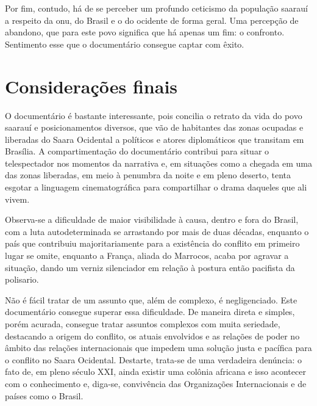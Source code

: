 	Por fim, contudo, há de se perceber um profundo ceticismo da população saarauí a respeito da \gls{onu}, do Brasil e o do ocidente de forma geral. Uma percepção de abandono, que para este povo significa que há apenas um fim: o confronto. Sentimento esse que o documentário consegue captar com êxito.
	
	\section{Considerações finais} \label{sec:final}
	
	O documentário é bastante interessante, pois concilia o retrato da vida do povo saarauí e posicionamentos diversos, que vão de habitantes das zonas ocupadas e liberadas do Saara Ocidental a políticos e atores diplomáticos que transitam em Brasília. A compartimentação do documentário contribui para situar o telespectador nos momentos da narrativa e, em situações como a chegada em uma das zonas liberadas, em meio à penumbra da noite e em pleno deserto, tenta esgotar a linguagem cinematográfica para compartilhar o drama daqueles que ali vivem.
		
	Observa-se a dificuldade de maior visibilidade à causa, dentro e fora do Brasil, com a luta autodeterminada se arrastando por mais de duas décadas, enquanto o país que contribuiu majoritariamente para a existência do conflito em primeiro lugar se omite, enquanto a França, aliada do Marrocos, acaba por agravar a situação, dando um verniz silenciador em relação à postura então pacifista da \gls{polisario}.
		
	Não é fácil tratar de um assunto que, além de complexo, é negligenciado. Este documentário consegue superar essa dificuldade. De maneira direta e simples, porém acurada, consegue tratar assuntos complexos com muita seriedade, destacando a origem do conflito, os atuais envolvidos e as relações de poder no âmbito das relações internacionais que impedem uma solução justa e pacífica para o conflito no Saara Ocidental. Destarte, trata-se de uma verdadeira denúncia: o fato de, em pleno século XXI, ainda existir uma colônia africana e isso acontecer com o conhecimento e, diga-se, convivência das Organizações Internacionais e de países como o Brasil. 
	
	
	\postextual
	
